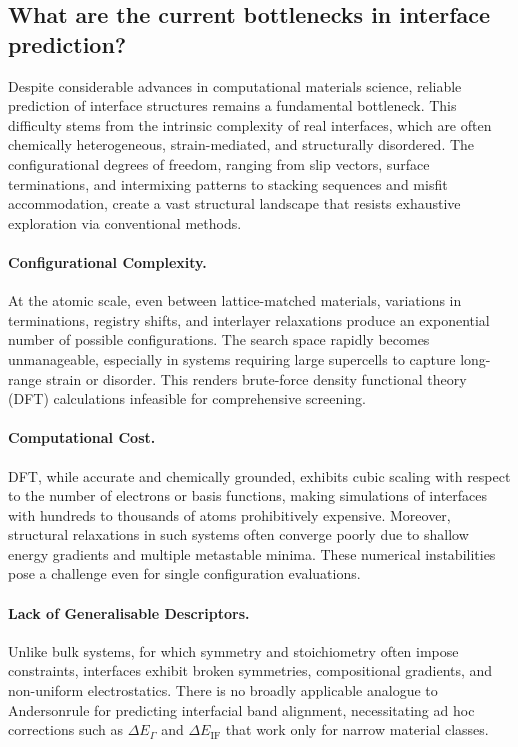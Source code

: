 \subsection{What are the current bottlenecks in interface prediction?}

Despite considerable advances in computational materials science, reliable prediction of interface structures remains a
fundamental bottleneck. This difficulty stems from the intrinsic complexity of real interfaces, which are often
chemically heterogeneous, strain-mediated, and structurally disordered. The configurational degrees of freedom, ranging
from slip vectors, surface terminations, and intermixing patterns to stacking sequences and misfit accommodation,
create a vast structural landscape that resists exhaustive exploration via conventional methods.

\paragraph{Configurational Complexity.} At the atomic scale, even between lattice-matched materials, variations in
terminations, registry shifts, and interlayer relaxations produce an exponential number of possible configurations. The
search space rapidly becomes unmanageable, especially in systems requiring large supercells to capture long-range
strain or disorder. This renders brute-force density functional theory (DFT) calculations infeasible for comprehensive
screening.

\paragraph{Computational Cost.} DFT, while accurate and chemically grounded, exhibits cubic scaling with respect to the
number of electrons or basis functions, making simulations of interfaces with hundreds to thousands of atoms
prohibitively expensive. Moreover, structural relaxations in such systems often converge poorly due to shallow energy
gradients and multiple metastable minima. These numerical instabilities pose a challenge even for single configuration
evaluations.

\paragraph{Lack of Generalisable Descriptors.} Unlike bulk systems, for which symmetry and stoichiometry often impose
constraints, interfaces exhibit broken symmetries, compositional gradients, and non-uniform electrostatics. There is no
broadly applicable analogue to Anderson\rqss rule for predicting interfacial band alignment, necessitating ad hoc
corrections such as $\Delta E_\Gamma$ and $\Delta E_{\mathrm{IF}}$ that work only for narrow material classes.

